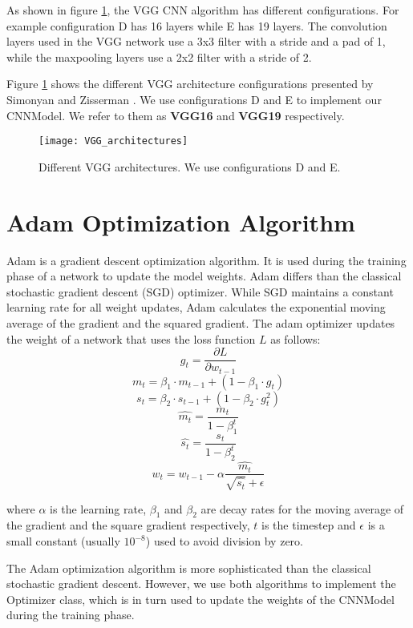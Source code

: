 As shown in figure \ref{fig:VGG_architectures}, the VGG CNN algorithm has different configurations. For example configuration D has 16 layers while E has 19 layers. The convolution layers used in the VGG network use a 3x3 filter with a stride and a pad of 1, while the maxpooling layers use a 2x2 filter with a stride of 2.

Figure \ref{fig:VGG_architectures} shows the different VGG architecture configurations presented by Simonyan and Zisserman \cite{simonyan2014very}. We use configurations D and E to implement our CNNModel. We refer to them as \textbf{VGG16} and \textbf{VGG19} respectively.

\begin{figure}[H]
\centering
  \texttt{[image: VGG\_architectures]}
\caption{Different VGG architectures. We use configurations D and E.}
\label{fig:VGG_architectures}
\end{figure}


\section{Adam Optimization Algorithm}\label{sec:adam_algorithm}
Adam \cite{kingma2014adam} is a gradient descent optimization algorithm. It is used during the training phase of a network to update the model weights. Adam differs than the classical stochastic gradient descent (SGD) optimizer. While SGD maintains a constant learning rate for all weight updates, Adam calculates the exponential moving average of the gradient and the squared gradient. The adam optimizer updates the weight of a network that uses the loss function $L$ as follows:
\[g_{t}=\dfrac{\partial L}{\partial w_{t-1}}\]
\[m_{t}=\beta_{1}\cdot m_{t-1}+(1-\beta_{1}\cdot g_{t})\]
\[s_{t}=\beta_{2}\cdot s_{t-1}+(1-\beta_{2}\cdot g_{t}^2)\]
\[\hat{m_{t}}=\dfrac{m_{t}}{1 - \beta_{1}^t}\]
\[\hat{s_{t}}=\dfrac{s_{t}}{1 - \beta_{2}^t}\]
\[w_{t}=w_{t-1}-\alpha\dfrac{\hat{m_{t}}}{\sqrt{\hat{s_{t}}}+\epsilon}\]

where $\alpha$ is the learning rate, $\beta_1$ and $\beta_2$ are decay rates for the moving average of the gradient and the square gradient respectively, $t$ is the timestep and $\epsilon$ is a small constant (usually $10^{-8}$) used to avoid division by zero.

The Adam optimization algorithm is more sophisticated than the classical stochastic gradient descent. However, we use both algorithms to implement the Optimizer class, which is in turn used to update the weights of the CNNModel during the training phase.
